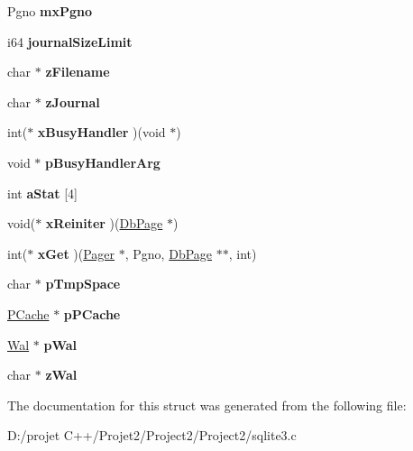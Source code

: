 \begin{DoxyCompactItemize}
Pgno {\bfseries mx\+Pgno}
\item 
\mbox{\label{struct_pager_ae381db4e0b49f92596b0cdeb279e6bc6}} 
i64 {\bfseries journal\+Size\+Limit}
\item 
\mbox{\label{struct_pager_a2a55a044468f8658b7993e57087a5561}} 
char $\ast$ {\bfseries z\+Filename}
\item 
\mbox{\label{struct_pager_ab36ce1f606c407ad3fc56a3651f5a319}} 
char $\ast$ {\bfseries z\+Journal}
\item 
\mbox{\label{struct_pager_ae1f5a3f57a0351a2d2f652716c48c463}} 
int($\ast$ {\bfseries x\+Busy\+Handler} )(void $\ast$)
\item 
\mbox{\label{struct_pager_a7a685e7a8dcbcd725c5a982fd8deb91b}} 
void $\ast$ {\bfseries p\+Busy\+Handler\+Arg}
\item 
\mbox{\label{struct_pager_a66a1cc92ae259c21def1fb9cf6745d04}} 
int {\bfseries a\+Stat} \mbox{[}4\mbox{]}
\item 
\mbox{\label{struct_pager_ad214904b953afe7d4718a713fedb8c98}} 
void($\ast$ {\bfseries x\+Reiniter} )(\mbox{\hyperlink{struct_pg_hdr}{Db\+Page}} $\ast$)
\item 
\mbox{\label{struct_pager_aa9ce69144089e7a64d7e493a56ca39bb}} 
int($\ast$ {\bfseries x\+Get} )(\mbox{\hyperlink{struct_pager}{Pager}} $\ast$, Pgno, \mbox{\hyperlink{struct_pg_hdr}{Db\+Page}} $\ast$$\ast$, int)
\item 
\mbox{\label{struct_pager_a64934188c72599e0be9ae54d3fc1cc92}} 
char $\ast$ {\bfseries p\+Tmp\+Space}
\item 
\mbox{\label{struct_pager_ae2495e45e354e92a858144386f91cab3}} 
\mbox{\hyperlink{struct_p_cache}{P\+Cache}} $\ast$ {\bfseries p\+P\+Cache}
\item 
\mbox{\label{struct_pager_a2c759424108248d8b08e6f400fab14dd}} 
\mbox{\hyperlink{struct_wal}{Wal}} $\ast$ {\bfseries p\+Wal}
\item 
\mbox{\label{struct_pager_ac63ab281e48f9ac8521b85c1a90475b3}} 
char $\ast$ {\bfseries z\+Wal}
\end{DoxyCompactItemize}


The documentation for this struct was generated from the following file\+:\begin{DoxyCompactItemize}
\item 
D\+:/projet C++/\+Projet2/\+Project2/\+Project2/sqlite3.\+c\end{DoxyCompactItemize}
